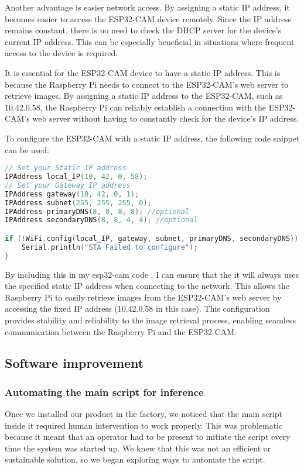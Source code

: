 Another advantage is easier network access. By assigning a static IP address, it becomes easier to access the ESP32-CAM device remotely. Since the IP address remains constant, there is no need to check the DHCP server for the device's current IP address. This can be especially beneficial in situations where frequent access to the device is required.

It is essential for the ESP32-CAM device to have a static IP address. This is because the Raspberry Pi needs to connect to the ESP32-CAM's web server to retrieve images. By assigning a static IP address to the ESP32-CAM, such as 10.42.0.58, the Raspberry Pi can reliably establish a connection with the ESP32-CAM's web server without having to constantly check for the device's IP address.

To configure the ESP32-CAM with a static IP address, the following code snippet can be used:
\FloatBarrier
\begin{lstlisting}[language=C]
// Set your Static IP address
IPAddress local_IP(10, 42, 0, 58);
// Set your Gateway IP address
IPAddress gateway(10, 42, 0, 1);
IPAddress subnet(255, 255, 255, 0);
IPAddress primaryDNS(8, 8, 8, 8); //optional
IPAddress secondaryDNS(8, 8, 4, 4); //optional

if (!WiFi.config(local_IP, gateway, subnet, primaryDNS, secondaryDNS)) {
    Serial.println("STA Failed to configure");
}


\end{lstlisting}
By including this in my esp32-cam code , I can ensure that the it will always uses the specified static IP address when connecting to the network. This allows the Raspberry Pi to easily retrieve images from the ESP32-CAM's web server by accessing the fixed IP address (10.42.0.58 in this case). This configuration provides stability and reliability to the image retrieval process, enabling seamless communication between the Raspberry Pi and the ESP32-CAM.
\subsection{Software improvement}
\subsubsection{Automating the main script for inference}
Once we installed our product in the factory, we noticed that the main script inside it required human intervention to work properly. This was problematic because it meant that an operator had to be present to initiate the script every time the system was started up. We knew that this was not an efficient or sustainable solution, so we began exploring ways to automate the script.

